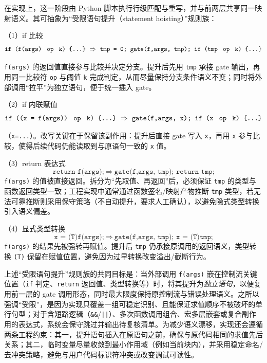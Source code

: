 \documentclass[UTF8,a4paper,12pt,twoside]{ctexart}  %
\begin{document}
在实现上，这一阶段由 Python
脚本执行行级匹配与重写，并与前两层共享同一映射语义。其可抽象为``受限语句提升（statement
hoisting）''规则族：


（1）if 比较
\begin{equation}
\texttt{if (f(args) \;op\; k) \{...\}}\ \Rightarrow\ \texttt{tmp = 0; gate(f,args, tmp); if (tmp \;op\; k) \{...\}}
\end{equation}

\indent\texttt{f(args)} 的返回值直接参与比较并决定分支。提升后先用 \texttt{tmp} 承接 gate 输出，再用同一比较符 \texttt{op} 与阈值 \texttt{k} 完成判定，从而尽量保持分支条件语义不变；同时将外部调用“拉平”为独立语句，便于统一插入 gate。

（2）if 内联赋值
\begin{equation}
\texttt{if ((x = f(args)) \;op\; k) \{...\}}\ \Rightarrow\ \texttt{gate(f,args, x); if (x \;op\; k) \{...\}}
\end{equation}

（\texttt{x=...}）。改写关键在于保留该副作用：提升后直接 gate 写入 \texttt{x}，再用 \texttt{x} 参与比较，使得后续代码仍能读取到与原语句一致的 \texttt{x} 值。

（3）return 表达式
\begin{equation}
\texttt{return f(args);}\ \Rightarrow\ \texttt{gate(f,args, tmp); return tmp;}
\end{equation}
\indent\texttt{f(args)} 的值被直接返回。拆分为“先取值、再返回”后，必须保证 \texttt{tmp} 的类型与函数返回类型一致；工程实现中通常通过函数签名/映射产物推断 \texttt{tmp} 类型，若无法可靠推断则采用保守策略（不自动提升，要求人工确认），以避免隐式类型转换引入语义偏差。

（4）显式类型转换
\begin{equation}
\texttt{x = (T)f(args);}\ \Rightarrow\ \texttt{gate(f,args, tmp); x = (T)tmp;}
\end{equation}
\indent\texttt{f(args)} 的结果先被强转再赋值。提升后 \texttt{tmp} 仍承接原调用的返回语义，类型转换 \texttt{(T)} 保留在赋值位置，避免因为过早转换改变溢出/截断行为。

上述“受限语句提升”规则族的共同目标是：当外部调用 \texttt{f(args)} 嵌在控制流关键位置（\texttt{if} 判定、\texttt{return} 返回值、类型转换等）时，将其提升为\emph{独立语句}，以便复用前一层的 gate 调用形态，同时最大限度保持原控制流与错误处理语义。之所以强调“受限”，是因为实现只覆盖一组可稳定识别、且能保证求值顺序不被破坏的单行句型；对于含短路逻辑（\texttt{\&\&}/\texttt{||}）、多次函数调用组合、宏多层嵌套或复合副作用的表达式，系统会保守跳过并输出待复核清单。为减少语义漂移，实现还会遵循两条工程约束：其一，提升语句插入在原语句之前，确保与原代码相同的求值先后关系；其二，临时变量尽量收敛到最小作用域（例如当前块内），并采用稳定命名/去冲突策略，避免与用户代码标识符冲突或改变调试可读性。
\end{document}
